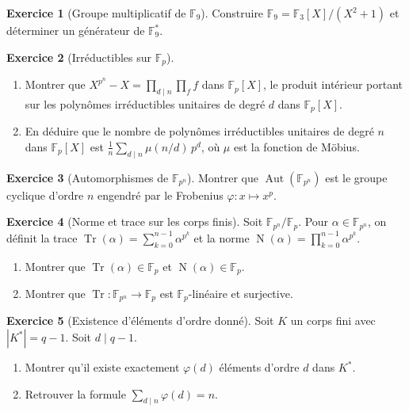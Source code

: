 \documentclass[12pt,a4paper,openany]{book}
\theoremstyle{definition}
\newtheorem{exercice}{Exercice}[chapter]
\newcommand{\F}{\mathbb{F}}
\newcommand{\Aut}{\operatorname{Aut}}
\begin{document}
\begin{exercice}[Groupe multiplicatif de $\F_9$]\label{exo:mult-F9}
Construire $\F_9 = \F_3[X]/(X^2+1)$ et déterminer un générateur de $\F_9^*$.
\end{exercice}

\begin{exercice}[Irréductibles sur $\F_p$]\label{exo:irred-Fp}
\begin{enumerate}[label=(\alph*)]
  \item Montrer que $X^{p^n} - X = \prod_{d \mid n} \prod_f f$ dans $\F_p[X]$,
    le produit intérieur portant sur les polynômes irréductibles unitaires de
    degré $d$ dans $\F_p[X]$.
  \item En déduire que le nombre de polynômes irréductibles unitaires de degré
    $n$ dans $\F_p[X]$ est $\frac{1}{n}\sum_{d \mid n} \mu(n/d)\, p^d$, où
    $\mu$ est la fonction de Möbius.
\end{enumerate}
\end{exercice}

\begin{exercice}[Automorphismes de $\F_{p^n}$]\label{exo:aut-Fpn}
Montrer que $\Aut(\F_{p^n})$ est le groupe cyclique d'ordre $n$ engendré par
le Frobenius $\varphi \colon x \mapsto x^p$.
\end{exercice}

\begin{exercice}[Norme et trace sur les corps finis]\label{exo:norme-trace}
Soit $\F_{p^n}/\F_p$. Pour $\alpha \in \F_{p^n}$, on définit la trace
$\operatorname{Tr}(\alpha) = \sum_{k=0}^{n-1} \alpha^{p^k}$ et la norme
$\operatorname{N}(\alpha) = \prod_{k=0}^{n-1} \alpha^{p^k}$.
\begin{enumerate}[label=(\alph*)]
  \item Montrer que $\operatorname{Tr}(\alpha) \in \F_p$ et
    $\operatorname{N}(\alpha) \in \F_p$.
  \item Montrer que $\operatorname{Tr} \colon \F_{p^n} \to \F_p$ est
    $\F_p$-linéaire et surjective.
\end{enumerate}
\end{exercice}

\begin{exercice}[Existence d'éléments d'ordre donné]\label{exo:ordre-donne}
Soit $K$ un corps fini avec $|K^*| = q - 1$. Soit $d \mid q - 1$.
\begin{enumerate}[label=(\alph*)]
  \item Montrer qu'il existe exactement $\varphi(d)$ éléments d'ordre $d$ dans
    $K^*$.
  \item Retrouver la formule $\sum_{d \mid n} \varphi(d) = n$.
\end{enumerate}
\end{exercice}
\end{document}
